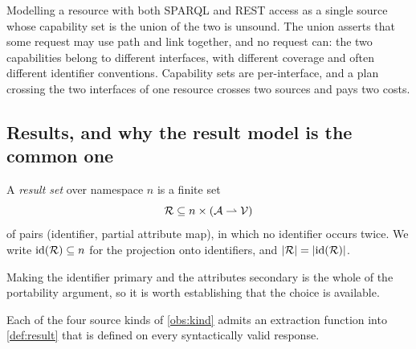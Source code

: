 \begin{remark}
\label{rem:not-union}
Modelling a resource with both SPARQL and REST access as a single source whose
capability set is the union of the two is unsound. The union asserts that some
request may use \textsf{path} and \textsf{link} together, and no request can:
the two capabilities belong to different interfaces, with different coverage
and often different identifier conventions. Capability sets are per-interface,
and a plan crossing the two interfaces of one resource crosses two sources and
pays two costs.
\end{remark}

\subsection{Results, and why the result model is the common one}

\begin{definition}
\label{def:result}
A \emph{result set} over namespace $n$ is a finite set
\[
\mathcal{R} \subseteq n \times (\mathcal{A} \rightharpoonup \mathcal{V})
\]
of pairs (identifier, partial attribute map), in which no identifier occurs
twice. We write $\mathrm{id}(\mathcal{R}) \subseteq n$ for the projection onto identifiers,
and $|\mathcal{R}| = |\mathrm{id}(\mathcal{R})|$.
\end{definition}

Making the identifier primary and the attributes secondary is the whole of the
portability argument, so it is worth establishing that the choice is available.

\begin{proposition}
\label{prop:common-result}
Each of the four source kinds of \cref{obs:kind} admits an extraction function
into \cref{def:result} that is defined on every syntactically valid response.
\end{proposition}

